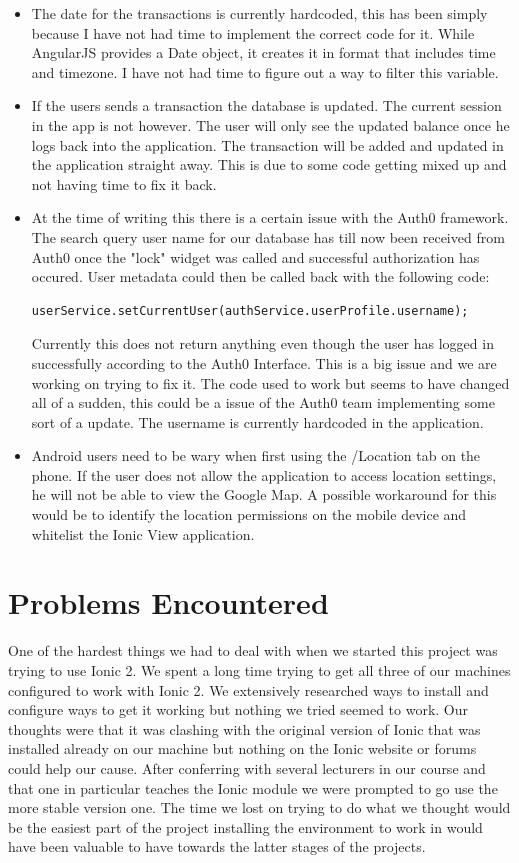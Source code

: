 \begin{itemize}
\begin{center}
    \end{center}
    \item The date for the transactions is currently hardcoded, this has been simply because I have not had time to implement the correct code for it. While AngularJS provides a Date object, it creates it in format that includes time and timezone. I have not had time to figure out a way to filter this variable.
    \item If the users sends a transaction the database is updated. The current session in the app is not however. The user will only see the updated balance once he logs back into the application. The transaction will be added and updated in the application straight away.
    This is due to some code getting mixed up and not having time to fix it back.
    \item At the time of writing this there is a certain issue with the Auth0 framework.
    The search query user name for our database has till now been received from Auth0 once the "lock" widget was called and successful authorization has occured. User metadata could then be called back with the following code:
\begin{verbatim}
userService.setCurrentUser(authService.userProfile.username);
\end{verbatim}
    Currently this does not return anything even though the user has logged in successfully according to the Auth0 Interface. This is a big issue and we are working on trying to fix it.
    The code used to work but seems to have changed all of a sudden, this could be a issue of the Auth0 team implementing some sort of a update. The username is currently hardcoded in the application.

    \item Android users need to be wary when first using the /Location tab on the phone. If the user does not allow the application to access location settings, he will not be able to view the Google Map. A possible workaround for this would be to identify the location permissions on the mobile device and whitelist the Ionic View application.


\end{itemize}
\section{Problems Encountered}
One of the hardest things we had to deal with when we started this project was trying to use Ionic 2. We spent a long time trying to get all three of our machines configured to work with Ionic 2. We extensively researched ways to install and configure ways to get it working but nothing we tried seemed to work. Our thoughts were that it was clashing with the original version of Ionic that was installed already on our machine but nothing on the Ionic website or forums could help our cause. After conferring with several lecturers in our course and that one in particular teaches the Ionic module we were prompted to go use the more stable version one. The time we lost on trying to do what we thought would be the easiest part of the project installing the environment to work in would have been valuable to have towards the latter stages of the projects.

